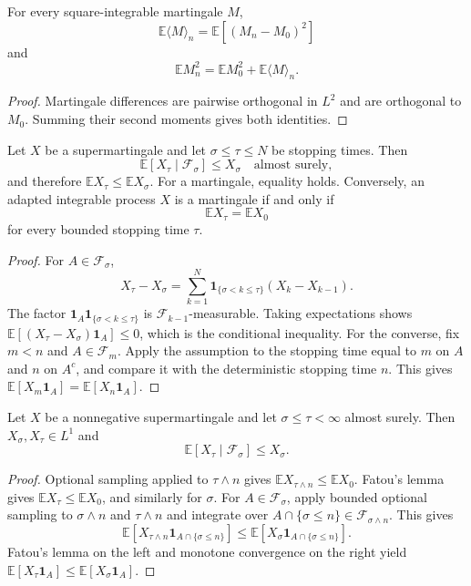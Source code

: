 \begin{prop}
For every square-integrable martingale $M$,
\[
\mathbb E\langle M\rangle_n
 =\mathbb E[(M_n-M_0)^2]
\]
and
\[
\mathbb E M_n^2
 =\mathbb E M_0^2+\mathbb E\langle M\rangle_n.
\]
\end{prop}

\begin{proof}
Martingale differences are pairwise orthogonal in $L^2$ and are orthogonal
to $M_0$. Summing their second moments gives both identities.
\end{proof}

\begin{thm}
Let $X$ be a supermartingale and let $\sigma\leq\tau\leq N$ be stopping times.
Then
\[
\mathbb E[X_\tau\mid\mathcal F_\sigma]\leq X_\sigma
\quad\text{almost surely},
\]
and therefore $\mathbb EX_\tau\leq\mathbb EX_\sigma$. For a martingale,
equality holds. Conversely, an adapted integrable process $X$ is a martingale
if and only if
\[
\mathbb EX_\tau=\mathbb EX_0
\]
for every bounded stopping time $\tau$.
\end{thm}

\begin{proof}
For $A\in\mathcal F_\sigma$,
\[
X_\tau-X_\sigma
 =\sum_{k=1}^{N}
  \mathbf1_{\{\sigma<k\leq\tau\}}(X_k-X_{k-1}).
\]
The factor
$\mathbf1_A\mathbf1_{\{\sigma<k\leq\tau\}}$ is
$\mathcal F_{k-1}$-measurable. Taking expectations shows
$\mathbb E[(X_\tau-X_\sigma)\mathbf1_A]\leq0$, which is the conditional
inequality. For the converse, fix $m<n$ and $A\in\mathcal F_m$. Apply the
assumption to the stopping time equal to $m$ on $A$ and $n$ on $A^c$, and
compare it with the deterministic stopping time $n$. This gives
$\mathbb E[X_m\mathbf1_A]=\mathbb E[X_n\mathbf1_A]$.
\end{proof}

\begin{cor}
Let $X$ be a nonnegative supermartingale and let
$\sigma\leq\tau<\infty$ almost surely. Then $X_\sigma,X_\tau\in L^1$ and
\[
\mathbb E[X_\tau\mid\mathcal F_\sigma]\leq X_\sigma.
\]
\end{cor}

\begin{proof}
Optional sampling applied to $\tau\wedge n$ gives
$\mathbb E X_{\tau\wedge n}\leq\mathbb E X_0$. Fatou's lemma gives
$\mathbb E X_\tau\leq\mathbb E X_0$, and similarly for $\sigma$. For
$A\in\mathcal F_\sigma$, apply bounded optional sampling to
$\sigma\wedge n$ and $\tau\wedge n$ and integrate over
$A\cap\{\sigma\leq n\}\in\mathcal F_{\sigma\wedge n}$. This gives
\[
\mathbb E[X_{\tau\wedge n}\mathbf1_{A\cap\{\sigma\leq n\}}]
 \leq
\mathbb E[X_\sigma\mathbf1_{A\cap\{\sigma\leq n\}}].
\]
Fatou's lemma on the left and monotone convergence on the right yield
$\mathbb E[X_\tau\mathbf1_A]\leq\mathbb E[X_\sigma\mathbf1_A]$.
\end{proof}

